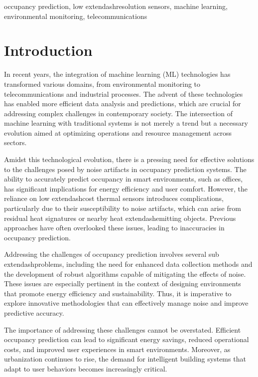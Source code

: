 \documentclass[runningheads]{llncs}
\begin{document}
\begin{keywords}
occupancy prediction, low	extendash{}resolution sensors, machine learning, environmental monitoring, telecommunications
\end{keywords}

\section{Introduction}
In recent years, the integration of machine learning (ML) technologies has transformed various domains, from environmental monitoring to telecommunications and industrial processes. The advent of these technologies has enabled more efficient data analysis and predictions, which are crucial for addressing complex challenges in contemporary society. The intersection of machine learning with traditional systems is not merely a trend but a necessary evolution aimed at optimizing operations and resource management across sectors.

Amidst this technological evolution, there is a pressing need for effective solutions to the challenges posed by noise artifacts in occupancy prediction systems. The ability to accurately predict occupancy in smart environments, such as offices, has significant implications for energy efficiency and user comfort. However, the reliance on low	extendash{}cost thermal sensors introduces complications, particularly due to their susceptibility to noise artifacts, which can arise from residual heat signatures or nearby heat	extendash{}emitting objects. Previous approaches have often overlooked these issues, leading to inaccuracies in occupancy prediction.

Addressing the challenges of occupancy prediction involves several sub	extendash{}problems, including the need for enhanced data collection methods and the development of robust algorithms capable of mitigating the effects of noise. These issues are especially pertinent in the context of designing environments that promote energy efficiency and sustainability. Thus, it is imperative to explore innovative methodologies that can effectively manage noise and improve predictive accuracy.

The importance of addressing these challenges cannot be overstated. Efficient occupancy prediction can lead to significant energy savings, reduced operational costs, and improved user experiences in smart environments. Moreover, as urbanization continues to rise, the demand for intelligent building systems that adapt to user behaviors becomes increasingly critical.
\end{document}
